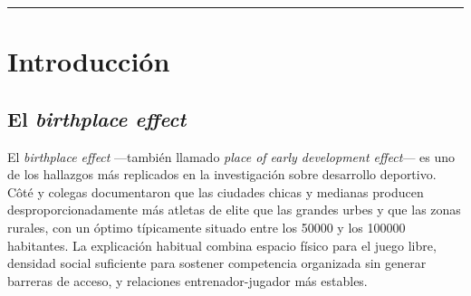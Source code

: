 \documentclass[11pt,a4paper]{article}
\newcommand{\ic}[2]{\mbox{IC 95\,\% #1--#2}}
\begin{document}
\begin{abstract}
\textbf{Con covariables, lo que domina es la pobreza y no la geografía de los
clubes.} Agregados al modelo el NBI departamental y la distancia al club formador
más cercano, el NBI explica siete veces más variación que el tamaño de la ciudad
(pseudo-$R^2$ 0,071 contra 0,010) y la distancia —fuerte por sí sola, IRR 0,825—
se apaga por completo (IRR 0,981; $p = 0{,}63$): era un proxy de pobreza. El
tamaño sobrevive atenuado (1,175 $\rightarrow$ 1,105). Y solo el 17\,\% de la
variación residual separa a un departamento de otro: el resto ocurre entre
ciudades vecinas, de modo que el mapa departamental resume mal el fenómeno.

\textbf{Un resultado condicional, sin denominador poblacional, apunta en
dirección contraria al principal, pero es frágil}: entre los futbolistas que ya
llegaron a un juvenil de la selección, los nacidos fuera de un gran aglomerado
llegan a la Mayor con más frecuencia —41,1\,\% contra 28,1\,\%; OR 1,78
(\ic{1,09}{2,93}), $p = 0{,}027$—. Al jugador del interior le costaría más entrar
y rendiría más una vez adentro. Se reporta con la advertencia de que \textbf{todo el
contraste lo aporta un solo estrato}: excluyendo el tramo de \num{10000} a
\num{50000} habitantes, 25 casos, el OR cae a 1,42 y el intervalo cruza el 1.

Se discute en detalle por qué las tasas por nacido quedan expuestas a dos
artefactos de medición de signo concordante, y qué haría falta para descartarlos.
\end{abstract}

\vspace{0.5em}
\hrule
\vspace{1.2em}

\section{Introducción}

\subsection{El \emph{birthplace effect}}

El \emph{birthplace effect} —también llamado \emph{place of early development
effect}— es uno de los hallazgos más replicados en la investigación sobre
desarrollo deportivo. Côté y colegas \cite{cote2006} documentaron que las
ciudades chicas y medianas producen desproporcionadamente más atletas de elite
que las grandes urbes y que las zonas rurales, con un óptimo típicamente situado
entre los \num{50000} y los \num{100000} habitantes. La explicación habitual
combina espacio físico para el juego libre, densidad social suficiente para
sostener competencia organizada sin generar barreras de acceso, y relaciones
entrenador-jugador más estables.
\end{document}
